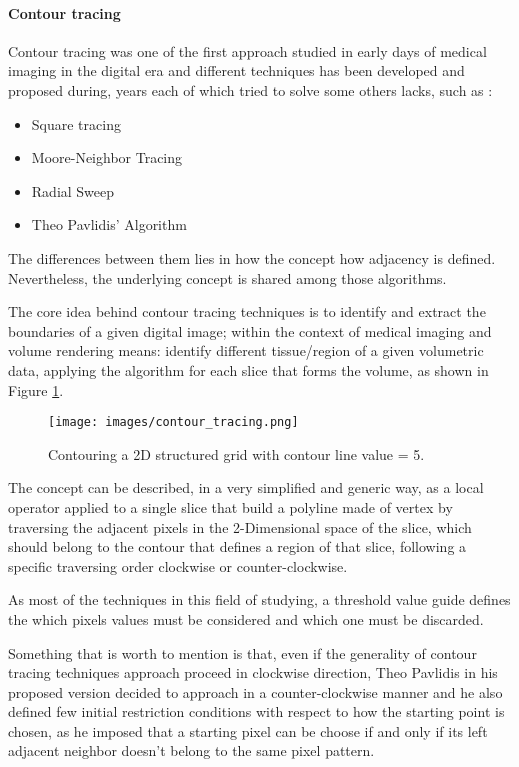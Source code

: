 \documentclass[12pt,a4paper]{extarticle}
\newcommand{\linespace}{\vspace{8pt}}
\begin{document}
\paragraph{Contour tracing}
Contour tracing was one of the first approach studied in early days of medical imaging in the digital era and different techniques has been developed and proposed during, years each of which tried to solve some others lacks, such as :
\begin{itemize}
\item Square tracing
\item Moore-Neighbor Tracing
\item Radial Sweep
\item Theo Pavlidis' Algorithm 
\end{itemize}
The differences between them lies in how the concept how adjacency is defined.
Nevertheless, the underlying concept is shared among those algorithms.
\linespace

The core idea behind contour tracing techniques is to identify and extract the boundaries of a given digital image; within the context of medical imaging and volume rendering means: identify different tissue/region of a given volumetric data, applying the algorithm for each slice that forms the volume, as shown in Figure \ref{fig:contouring2d}. 

\begin{figure}[hbtp]
\centering
\texttt{[image: images/contour\_tracing.png]}
\caption{Contouring a 2D structured grid with contour line value = 5.}
\label{fig:contouring2d}
\end{figure}


The concept can be described, in a very simplified and generic way, as a local operator %
applied to a single slice that build a polyline made of vertex by traversing the adjacent pixels in the 2-Dimensional space of the slice, which should belong to the contour that defines a region of that slice, following a specific traversing order clockwise or counter-clockwise. 

As most of the techniques in this field of studying, a threshold value guide defines the which pixels values must be considered and which one must be discarded.

Something that is worth to mention is that, even if the generality of contour tracing techniques approach proceed in clockwise direction, Theo Pavlidis in his proposed version decided to approach in a counter-clockwise manner and he also defined few initial restriction conditions with respect to how the starting point is chosen, as he imposed that a starting pixel can be choose if and only if its left adjacent neighbor doesn't belong to the same pixel pattern.
\linespace
\end{document}

